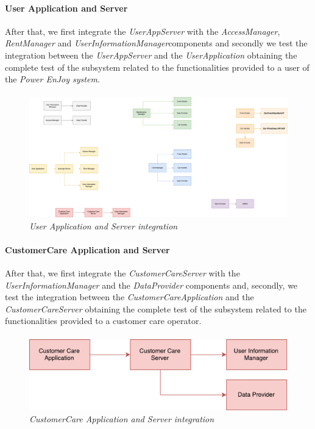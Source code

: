 \paragraph{User Application and Server} 
After that, we first integrate the \emph{UserAppServer} with the \emph{AccessManager}, \emph{RentManager} and \emph{UserInformationManager}components and secondly we test the integration between the \emph{UserAppServer} and the \emph{UserApplication} obtaining the complete test of the subsystem related to the functionalities provided to a user of the \emph{Power EnJoy system}.
\paragraph{}
		
		\begin{figure}[h]
			\centering
			\includegraphics[width=0.7\linewidth]{img/Integration4}
			\caption{
				\label{fig:userAppServer} 
				\emph{User Application and Server integration}
			}
		\end{figure}
		
\paragraph{CustomerCare Application and Server} 
After that, we first integrate the \emph{CustomerCareServer} with the \emph{UserInformationManager} and the \emph{DataProvider} components  and, secondly, we test the integration between the \emph{CustomerCareApplication} and the \emph{CustomerCareServer} obtaining the complete test of the subsystem related to the functionalities provided to a customer care operator.
\paragraph{}
		
		\begin{figure}[h]
			\centering
			\includegraphics[width=0.8\linewidth]{img/Integration3c}
			\caption{
				\label{fig:ccAppServer} 
				\emph{CustomerCare Application and Server integration}
			}
		\end{figure}

